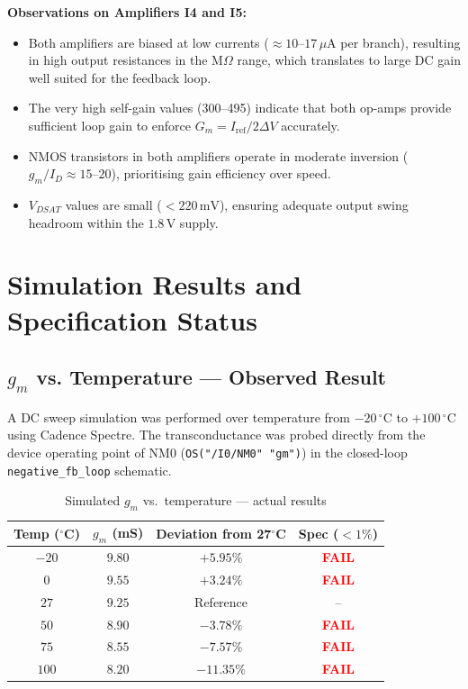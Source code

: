 \documentclass[12pt,a4paper]{article}
\begin{document}
\textbf{Observations on Amplifiers I4 and I5:}
\begin{itemize}[leftmargin=1.5em]
  \item Both amplifiers are biased at low currents ($\approx 10$--$17\,\mu$A per branch),
        resulting in high output resistances in the M$\Omega$ range, which translates to
        large DC gain well suited for the feedback loop.
  \item The very high self-gain values (300--495) indicate that both op-amps provide
        sufficient loop gain to enforce $G_m = I_{\text{ref}}/2\Delta V$ accurately.
  \item NMOS transistors in both amplifiers operate in moderate inversion
        ($g_m/I_D \approx 15$--$20$), prioritising gain efficiency over speed.
  \item $V_{DSAT}$ values are small ($< 220\,\text{mV}$), ensuring adequate output
        swing headroom within the $1.8\,\text{V}$ supply.
\end{itemize}

\section{Simulation Results and Specification Status}

\subsection{$g_m$ vs. Temperature — Observed Result}

A DC sweep simulation was performed over temperature from $-20\,^\circ$C to $+100\,^\circ$C
using Cadence Spectre. The transconductance was probed directly from the device operating
point of NM0 (\texttt{OS("/I0/NM0" "gm")}) in the closed-loop \texttt{negative\_fb\_loop}
schematic.

\begin{table}[H]
  \centering
  \caption{Simulated $g_m$ vs.\ temperature — actual results}
  \renewcommand{\arraystretch}{1.3}
  \begin{tabular}{cccc}
    \toprule
    \textbf{Temp ($^\circ$C)} & \textbf{$g_m$ (mS)} & \textbf{Deviation from 27$^\circ$C} & \textbf{Spec ($<1\%$)} \\
    \midrule
    $-20$  & $9.80$ & $+5.95\%$  & \textcolor{red}{\textbf{FAIL}} \\
    $0$    & $9.55$ & $+3.24\%$  & \textcolor{red}{\textbf{FAIL}} \\
    $27$   & $9.25$ & Reference  & --                              \\
    $50$   & $8.90$ & $-3.78\%$  & \textcolor{red}{\textbf{FAIL}} \\
    $75$   & $8.55$ & $-7.57\%$  & \textcolor{red}{\textbf{FAIL}} \\
    $100$  & $8.20$ & $-11.35\%$ & \textcolor{red}{\textbf{FAIL}} \\
    \bottomrule
  \end{tabular}
\end{table}
\end{document}

